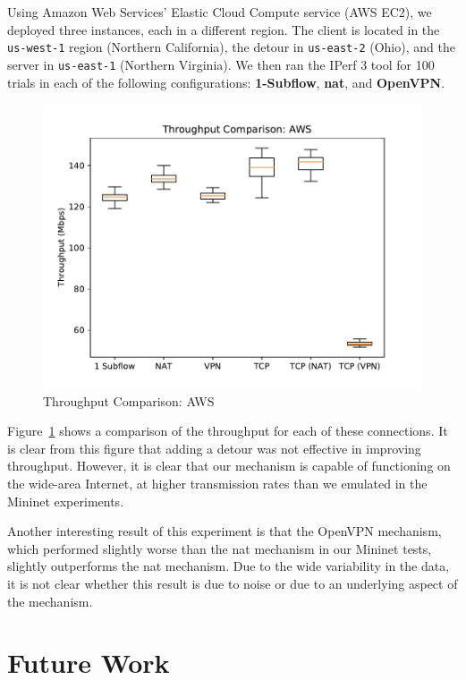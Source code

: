 \documentclass{cwru}
\begin{document}
Using Amazon Web Services' Elastic Cloud Compute service (AWS EC2), we deployed
three instances, each in a different region. The client is located in the
\texttt{us-west-1} region (Northern California), the detour in
\texttt{us-east-2} (Ohio), and the server in \texttt{us-east-1} (Northern
Virginia). We then ran the IPerf 3 tool for 100 trials in each of the following
configurations: \textbf{1-Subflow}, \textbf{\ac{nat}}, and \textbf{OpenVPN}.

\begin{figure}
  \centering
  \includegraphics[height=0.45\textheight]{figures/aws.pdf}
  \caption{Throughput Comparison: AWS}
  \label{fig:aws}
\end{figure}

Figure~\ref{fig:aws} shows a comparison of the throughput for each of these
connections. It is clear from this figure that adding a detour was not effective
in improving throughput. However, it is clear that our mechanism is capable of
functioning on the wide-area Internet, at higher transmission rates than we
emulated in the Mininet experiments.

Another interesting result of this experiment is that the OpenVPN mechanism,
which performed slightly worse than the \ac{nat} mechanism in our Mininet tests,
slightly outperforms the \ac{nat} mechanism. Due to the wide variability in the
data, it is not clear whether this result is due to noise or due to an
underlying aspect of the mechanism.

\chapter{Future Work}
\label{c:fw}
\end{document}
